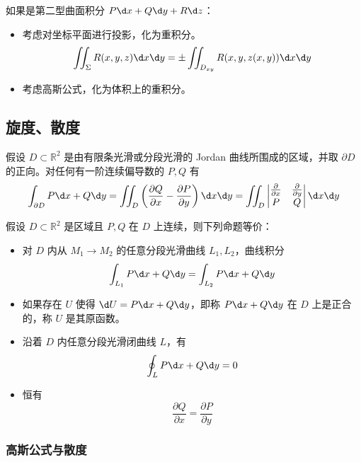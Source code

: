 如果是第二型曲面积分 $P \d x + Q \d y + R \d z$：
\begin{itemize}
	\item 考虑对坐标平面进行投影，化为重积分。
	      \[ \iint_{\Sigma} R(x, y, z) \d x \d y = \pm \iint_{D_{xy}} R(x, y, z(x, y)) \d x \d y \]
	\item 考虑高斯公式，化为体积上的重积分。
\end{itemize}

\subsection{旋度、散度}

\begin{theorem}[Green 公式]
	假设 $D \subset \mathbb{R}^2$ 是由有限条光滑或分段光滑的 Jordan 曲线所围成的区域，并取 $\partial D$ 的正向。对任何有一阶连续偏导数的 $P, Q$ 有
	\[ \int_{\partial D} P \d x + Q \d y = \iint_{D} \left( \frac{\partial Q}{\partial x} - \frac{\partial P}{\partial y} \right) \d x \d y = \iint_{D} \left| \begin{matrix}
			\frac{\partial}{\partial x} & \frac{\partial}{\partial y} \\
			P                           & Q
		\end{matrix} \right| \d x \d y \]
\end{theorem}

\begin{theorem}[Green 定理]
	假设 $D \subset \mathbb{R}^2$ 是区域且 $P, Q$ 在 $D$ 上连续，则下列命题等价：

	\begin{itemize}
		\item 对 $D$ 内从 $M_1 \to M_2$ 的任意分段光滑曲线 $L_1, L_2$，曲线积分
		      \[ \int_{L_1} P \d x + Q \d y = \int_{L_2} P \d x + Q \d y \]
		\item 如果存在 $U$ 使得 $\d U = P \d x + Q \d y$，即称 $P \d x + Q \d y$ 在 $D$ 上是正合的，称 $U$ 是其原函数。
		\item 沿着 $D$ 内任意分段光滑闭曲线 $L$，有
		      \[ \oint_{L} P \d x + Q \d y = 0 \]
		\item 恒有
		      \[ \frac{\partial Q}{\partial x} = \frac{\partial P}{\partial y} \]
	\end{itemize}
\end{theorem}

\subsubsection*{高斯公式与散度}

